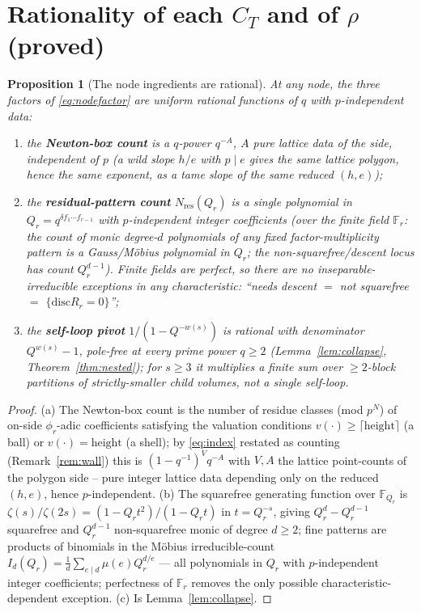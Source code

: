 \documentclass[11pt]{article}
\newtheorem{proposition}[theorem]{Proposition}
\theoremstyle{definition}
\theoremstyle{remark}
\newcommand{\Fr}{\mathbb{F}_r}
\newcommand{\disc}{\mathrm{disc}}
\newcommand{\vp}{v}
\begin{document}
\section{Rationality of each $C_T$ and of $\rho$ (proved)}\label{sec:rational}

\begin{proposition}[The node ingredients are rational]\label{prop:ingredients}
At any node, the three factors of \eqref{eq:nodefactor} are uniform rational
functions of $q$ with $p$-independent data:
\begin{enumerate}[label=\textup{(\alph*)},nosep]
\item the \textbf{Newton-box count} is a $q$-power $q^{-A}$, $A$ pure lattice data
of the side, independent of $p$ (a wild slope $h/e$ with $p\mid e$ gives the same
lattice polygon, hence the same exponent, as a tame slope of the same reduced
$(h,e)$);
\item the \textbf{residual-pattern count} $N_{\mathrm{res}}(Q_r)$ is a single
polynomial in $Q_r=q^{\delta f_1\cdots f_{r-1}}$ with $p$-independent integer
coefficients (over the finite field $\Fr$: the count of monic degree-$d$
polynomials of any fixed factor-multiplicity pattern is a Gauss/M\"obius polynomial
in $Q_r$; the non-squarefree/descent locus has count $Q_r^{d-1}$). Finite fields
are perfect, so there are \emph{no inseparable-irreducible exceptions in any
characteristic}: ``needs descent $=$ not squarefree $=$ $\{\disc R_r=0\}$'';
\item the \textbf{self-loop pivot} $1/(1-Q^{-w(s)})$ is rational with denominator
$Q^{w(s)}-1$, pole-free at every prime power $q\ge2$ (Lemma~\ref{lem:collapse},
Theorem~\ref{thm:nested}); for $s\ge3$ it multiplies a finite sum over $\ge2$-block
partitions of strictly-smaller child volumes, not a single self-loop.
\end{enumerate}
\end{proposition}

\begin{proof}
(a) The Newton-box count is the number of residue classes (mod $p^N$) of on-side
$\phi_r$-adic coefficients satisfying the valuation conditions $\vp(\cdot)\ge
\lceil\text{height}\rceil$ (a ball) or $\vp(\cdot)=\text{height}$ (a shell);
by \eqref{eq:index} restated as counting (Remark~\ref{rem:wall}) this is
$(1-q^{-1})^V q^{-A}$ with $V,A$ the lattice point-counts of the polygon side --
pure integer lattice data depending only on the reduced $(h,e)$, hence
$p$-independent. (b) The squarefree generating function over $\mathbb F_{Q_r}$ is
$\zeta(s)/\zeta(2s)=(1-Q_rt^2)/(1-Q_rt)$ in $t=Q_r^{-s}$, giving $Q_r^d-Q_r^{d-1}$
squarefree and $Q_r^{d-1}$ non-squarefree monic of degree $d\ge2$; fine patterns
are products of binomials in the M\"obius irreducible-count
$I_d(Q_r)=\frac1d\sum_{e\mid d}\mu(e)Q_r^{d/e}$ --- all polynomials in $Q_r$ with
$p$-independent integer coefficients; perfectness of $\Fr$ removes the only
possible characteristic-dependent exception. (c) Is Lemma~\ref{lem:collapse}.
\end{proof}
\end{document}
